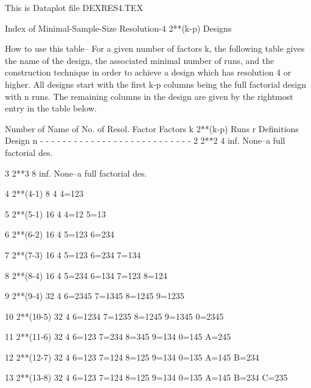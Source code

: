 This is Dataplot file DEXRES4.TEX
 
Index of Minimal-Sample-Size Resolution-4 2**(k-p) Designs
 
How to use this table--
   For a given number of factors k, the
   following table gives the name of the
   design, the associated minimal number
   of runs, and the construction technique
   in order to achieve a design which has
   resolution 4 or higher.  All designs start
   with the first k-p columns being the full
   factorial design with n runs.  The remaining
   columns in the design are given by the
   rightmost entry in the table below.
 
   Number of  Name of    No. of Resol.  Factor
   Factors k  2**(k-p)    Runs    r     Definitions
               Design      n
   - - - - - - - - - - - - - - - - - - - - - - - - - - -
       2      2**2         4     inf.   None--a full
                                        factorial des.
 
       3      2**3         8     inf.   None--a full
                                        factorial des.
 
       4      2**(4-1)     8      4     4=123
 
       5      2**(5-1)    16      4     4=12 5=13
 
       6      2**(6-2)    16      4     5=123 6=234
 
       7      2**(7-3)    16      4     5=123 6=234
                                        7=134
 
       8      2**(8-4)    16      4     5=234 6=134
                                        7=123 8=124
 
       9      2**(9-4)    32      4     6=2345 7=1345
                                        8=1245 9=1235
 
      10      2**(10-5)   32      4     6=1234 7=1235
                                        8=1245 9=1345
                                        0=2345
 
      11      2**(11-6)   32      4     6=123 7=234
                                        8=345 9=134
                                        0=145 A=245
 
      12      2**(12-7)   32      4     6=123 7=124
                                        8=125 9=134
                                        0=135 A=145
                                        B=234
 
      13      2**(13-8)   32      4     6=123 7=124
                                        8=125 9=134
                                        0=135 A=145
                                        B=234 C=235
 
